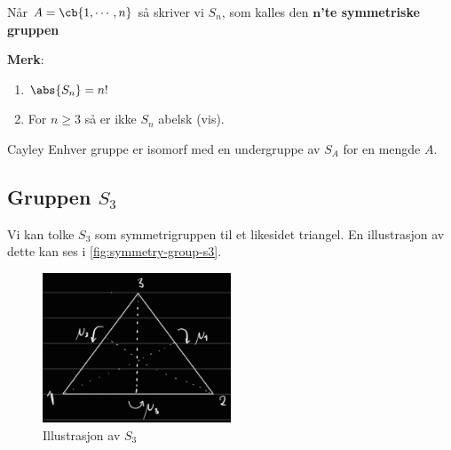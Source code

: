 \begin{definition}{}{}
	Når $A=\cb{1, \cdots, n}$ så skriver vi $S_n$, som kalles den
	\textbf{$\mathbf{n}$'te symmetriske gruppen}
\end{definition}

\textbf{Merk}:
\begin{enumerate}
	\item $\abs{S_n}=n!$
	\item For $n\geq 3$ så er ikke $S_n$ abelsk (vis).
\end{enumerate}

\begin{theorem*}{Cayley}{}
	Enhver gruppe er isomorf med en undergruppe av $S_A$ for en mengde $A$.
\end{theorem*}

\subsection{Gruppen $S_3$}
Vi kan tolke $S_3$ som symmetrigruppen til et likesidet triangel. En illustrasjon av dette kan
ses i \autoref{fig:symmetry-group-s3}.

\begin{figure}[ht]
	\centering
	\includegraphics[width=0.5\textwidth]{images/symmetry_group_s3_illustration.jpg}
	\caption{Illustrasjon av $S_3$}
	\label{fig:symmetry-group-s3}
\end{figure}

